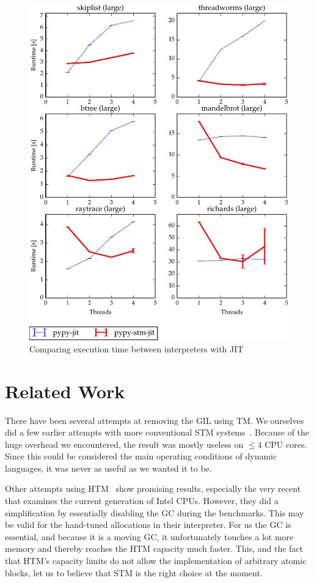 \documentclass{sigplanconf}
\begin{document}
\begin{figure}[h]
  \centering
  \includegraphics[width=1\columnwidth]{plots/performance.pdf}
  \caption{Comparing execution time between interpreters with JIT\label{fig:performance-jit}}
\end{figure}



\section{Related Work}

There have been several attempts at removing the GIL using TM. We
ourselves did a few earlier attempts with more conventional STM
systems~\cite{stmupdate13}. Because of the huge overhead we
encountered, the result was mostly useless on $\le 4$ CPU cores.
Since this could be considered the main operating conditions of
dynamic languages, it was never as useful as we wanted it to be.

Other attempts using HTM~\cite{nicholas06,odaira14,fuad10} show
promising results, especially the very recent~\cite{odaira14} that
examines the current generation of Intel CPUs. However, they did a
simplification by essentially disabling the GC during the
benchmarks. This may be valid for the hand-tuned allocations in their
interpreter. For us the GC is essential, and because it is a moving
GC, it unfortunately touches a lot more memory and thereby reaches the
HTM capacity much faster.  This, and the fact that HTM's capacity
limits do not allow the implementation of arbitrary atomic blocks, let
us to believe that STM is the right choice at the moment.
\end{document}
